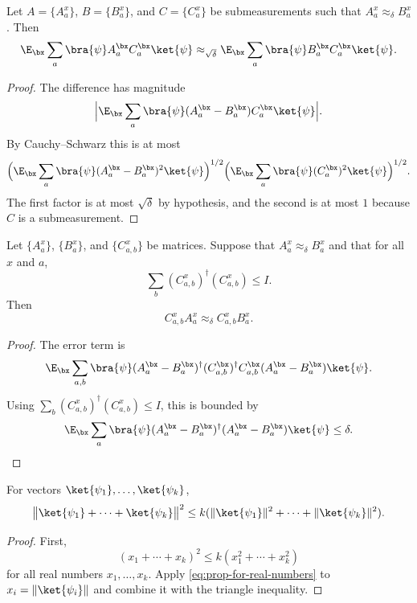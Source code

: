 \begin{theorem}\label{prop:easy-approx-from-approx-delta}
	\leanok
	Let $A = \{A^x_a\}$, $B = \{B^x_a\}$, and $C = \{C^x_a\}$ be submeasurements such that $A^x_a \approx_{\delta} B^x_a$. Then
	\begin{equation*}
		\E_{\bx} \sum_a \bra{\psi} A^{\bx}_a  C^{\bx}_a \ket{\psi}
		\approx_{\sqrt{\delta}} \E_{\bx} \sum_a \bra{\psi} B^{\bx}_a  C^{\bx}_a \ket{\psi}.
	\end{equation*}
\end{theorem}
\begin{proof}
	\leanok
	The difference has magnitude
	\[
		\Big| \E_{\bx} \sum_a \bra{\psi} (A^{\bx}_a - B^{\bx}_a) C^{\bx}_a \ket{\psi}\Big|.
	\]
	By Cauchy--Schwarz this is at most
	\[
		\Big(\E_{\bx} \sum_a \bra{\psi} (A^{\bx}_a - B^{\bx}_a)^2 \ket{\psi}\Big)^{1/2}
		\Big(\E_{\bx} \sum_a \bra{\psi} (C^{\bx}_a)^2 \ket{\psi}\Big)^{1/2}.
	\]
	The first factor is at most $\sqrt{\delta}$ by hypothesis, and the second is at most $1$ because $C$ is a submeasurement.
\end{proof}

\begin{theorem}\label{prop:cab-approx-delta}
	\leanok
	Let $\{A^x_a\}$, $\{B^x_a\}$, and $\{C^x_{a,b}\}$ be matrices. Suppose that $A^{x}_a \approx_\delta B^{x}_a$ and that for all $x$ and $a$,
	\[
		\sum_b (C^{x}_{a,b})^\dagger (C^{x}_{a,b}) \leq I.
	\]
	Then
	\[
		C^{x}_{a,b} A^x_{a} \approx_{\delta} C^{x}_{a,b} B^{x}_a.
	\]
\end{theorem}
\begin{proof}
	\leanok
	The error term is
	\[
		\E_{\bx} \sum_{a,b} \bra{\psi}
		(A^{\bx}_a - B^{\bx}_a)^\dagger
		(C^{\bx}_{a,b})^\dagger C^{\bx}_{a,b}
		(A^{\bx}_a - B^{\bx}_a) \ket{\psi}.
	\]
	Using $\sum_b (C^{x}_{a,b})^\dagger (C^{x}_{a,b}) \le I$, this is bounded by
	\[
		\E_{\bx} \sum_a \bra{\psi}
		(A^{\bx}_a - B^{\bx}_a)^\dagger
		(A^{\bx}_a - B^{\bx}_a) \ket{\psi}
		\le \delta.
	\]
\end{proof}

\begin{lemma}\label{prop:triangle-inequality-for-vectors-squared}
	\leanok
	For vectors $\ket{\psi_1},\dots,\ket{\psi_k}$,
	\[
		\bigl\lVert \ket{\psi_1}+\cdots+\ket{\psi_k} \bigr\rVert^2 \le k(\lVert\ket{\psi_1}\rVert^2+\cdots+\lVert\ket{\psi_k}\rVert^2).
	\]
\end{lemma}
\begin{proof}
	\leanok
	First,
	\begin{equation}\label{eq:prop-for-real-numbers}
		(x_1+\cdots+x_k)^2 \le k(x_1^2+\cdots+x_k^2)
	\end{equation}
	for all real numbers $x_1,\dots,x_k$. Apply \eqref{eq:prop-for-real-numbers} to $x_i=\lVert\ket{\psi_i}\rVert$ and combine it with the triangle inequality.
\end{proof}

